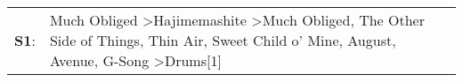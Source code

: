 \begin{supertabular}{p{0.03\textwidth}p{0.92\textwidth}}
 \textbf{S1}:  &  Much Obliged\textsuperscript{} \textgreater \enspace Hajimemashite\textsuperscript{} \textgreater \enspace Much Obliged\textsuperscript{}, \enspace The Other Side of Things\textsuperscript{}, \enspace Thin Air\textsuperscript{}, \enspace Sweet Child o' Mine\textsuperscript{}, \enspace August\textsuperscript{}, \enspace Avenue\textsuperscript{}, \enspace G-Song\textsuperscript{} \textgreater \enspace Drums[1]\textsuperscript{}  \enspace  \\
\end{supertabular}
